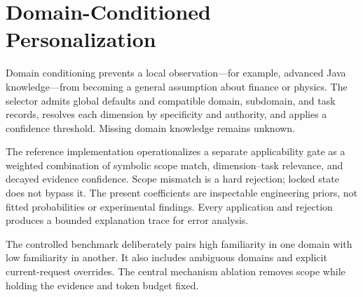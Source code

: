 \section{Domain-Conditioned Personalization}
\label{sec:conditioning}

Domain conditioning prevents a local observation---for example, advanced Java
knowledge---from becoming a general assumption about finance or physics. The
selector admits global defaults and compatible domain, subdomain, and task
records, resolves each dimension by specificity and authority, and applies a
confidence threshold. Missing domain knowledge remains unknown.

The reference implementation operationalizes a separate applicability gate as a
weighted combination of symbolic scope match, dimension--task relevance, and
decayed evidence confidence. Scope mismatch is a hard rejection; locked state
does not bypass it. The present coefficients are inspectable engineering priors,
not fitted probabilities or experimental findings. Every application and
rejection produces a bounded explanation trace for error analysis.

The controlled benchmark deliberately pairs high familiarity in one domain with
low familiarity in another. It also includes ambiguous domains and explicit
current-request overrides. The central mechanism ablation removes scope while
holding the evidence and token budget fixed.

